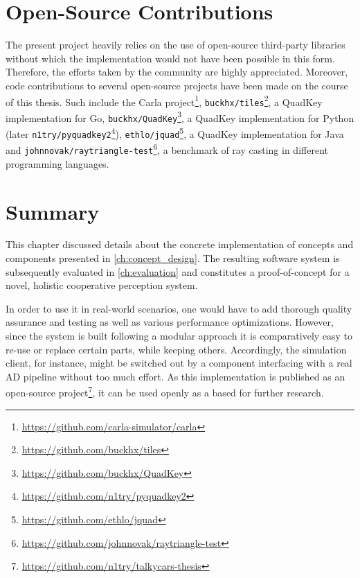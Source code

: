 \section{Open-Source Contributions}
\label{sec:implementation:open_source_contributions}
The present project heavily relies on the use of open-source third-party libraries without which the implementation would not have been possible in this form. Therefore, the efforts taken by the community are highly appreciated. Moreover, code contributions to several open-source projects have been made on the course of this thesis. Such include the Carla project\footnote{\url{https://github.com/carla-simulator/carla}}, \texttt{buckhx/tiles}\footnote{\url{https://github.com/buckhx/tiles}}, a QuadKey implementation for Go, \texttt{buckhx/QuadKey}\footnote{\url{https://github.com/buckhx/QuadKey}}, a QuadKey implementation for Python (later \texttt{n1try/pyquadkey2}\footnote{\url{https://github.com/n1try/pyquadkey2}}), \texttt{ethlo/jquad}\footnote{\url{https://github.com/ethlo/jquad}}, a QuadKey implementation for Java and \texttt{johnnovak/raytriangle-test}\footnote{\url{https://github.com/johnnovak/raytriangle-test}}, a benchmark of ray casting in different programming languages.

\section{Summary}
\label{sec:implementation:summary}
This chapter discussed details about the concrete implementation of concepts and components presented in \cref{ch:concept_design}. The resulting software system is subsequently evaluated in \cref{ch:evaluation} and constitutes a proof-of-concept for a novel, holistic cooperative perception system.

In order to use it in real-world scenarios, one would have to add thorough quality assurance and testing as well as various performance optimizations. However, since the system is built following a modular approach it is comparatively easy to re-use or replace certain parts, while keeping others. Accordingly, the simulation client, for instance, might be switched out by a component interfacing with a real AD pipeline without too much effort. As this implementation is published as an open-source project\footnote{\url{https://github.com/n1try/talkycars-thesis}}, it can be used openly as a based for further research. 